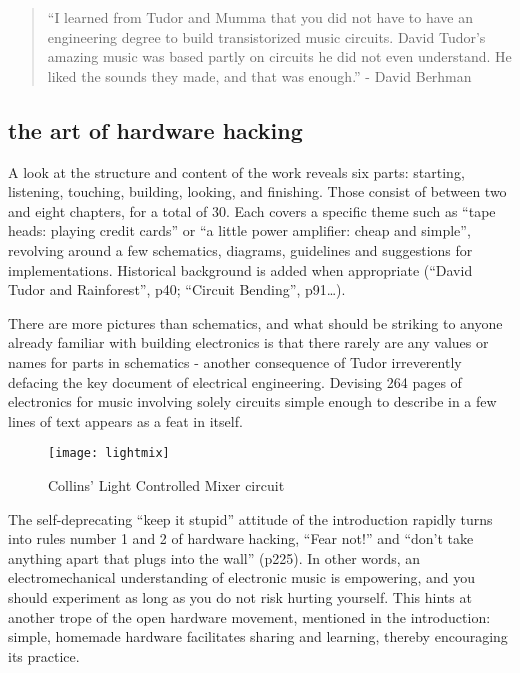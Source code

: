 \begin{itemize}
\begin{quote}
“I learned from Tudor and Mumma that you did not have to have an engineering degree to build transistorized music circuits. David Tudor’s amazing music was based partly on circuits he did not even understand. He liked the sounds they made, and that was enough.” 
- David Berhman \cite[p.ix]{collins2006}  
\end{quote}

\subsection{the art of hardware hacking}

A look at the structure and content of the work reveals six parts: starting, listening, touching, building, looking, and finishing. Those consist of between two and eight chapters, for a total of 30. Each covers a specific theme such as ``tape heads: playing credit cards'' or ``a little power amplifier: cheap and simple'', revolving around a few schematics, diagrams, guidelines and suggestions for implementations. Historical background is added when appropriate (``David Tudor and Rainforest'', p40; ``Circuit Bending'', p91…). 

There are more pictures than schematics, and what should be striking to anyone already familiar with building electronics is that there rarely are any values or names for parts in schematics - another consequence of Tudor irreverently defacing the key document of electrical engineering. Devising 264 pages of electronics for music involving solely circuits simple enough to describe in a few lines of text appears as a feat in itself. 

	\begin{figure}[h!]
	  \caption{Collins' Light Controlled Mixer circuit}
	  \centering
	    \texttt{[image: lightmix]}
	\end{figure}

The self-deprecating “keep it stupid” attitude of the introduction rapidly turns into rules number 1 and 2 of hardware hacking, “Fear not!” and “don’t take anything apart that plugs into the wall” (p225). In other words, an electromechanical understanding of electronic music is empowering, and you should experiment as long as you do not risk hurting yourself. This hints at another trope of the open hardware movement, mentioned in the introduction: simple, homemade hardware facilitates sharing and learning, thereby encouraging its practice.


\end{itemize}
